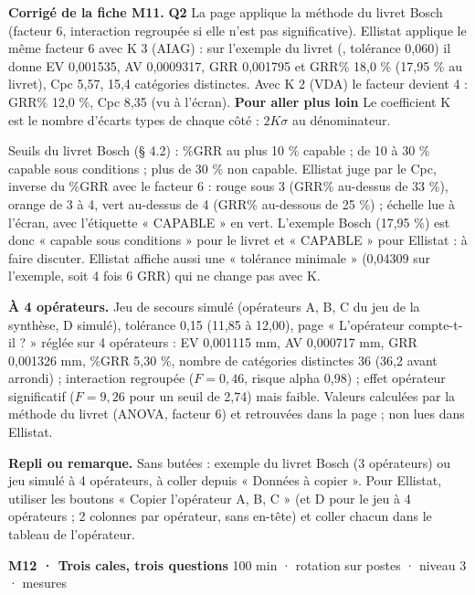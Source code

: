 \textbf{\color{ok}Corrigé de la fiche M11.} \textbf{Q2} La page applique la méthode du livret Bosch (facteur 6, interaction regroupée si elle n'est pas significative). Ellistat applique le même facteur 6 avec K 3 (AIAG) : sur l'exemple du livret (, tolérance 0,060) il donne EV 0,001535, AV 0,0009317, GRR 0,001795 et GRR\% 18,0 \% (17,95 \% au livret), Cpc 5,57, 15,4 catégories distinctes. Avec K 2 (VDA) le facteur devient 4 : GRR\% 12,0 \%, Cpc 8,35 (vu à l'écran). \textbf{Pour aller plus loin} Le coefficient K est le nombre d'écarts types de chaque côté : $2K\sigma$ au dénominateur.\par Seuils du livret Bosch (§ 4.2) : \%GRR au plus 10 \% capable ; de 10 à 30 \% capable sous conditions ; plus de 30 \% non capable. Ellistat juge par le Cpc, inverse du \%GRR avec le facteur 6 : rouge sous 3 (GRR\% au-dessus de 33 \%), orange de 3 à 4, vert au-dessus de 4 (GRR\% au-dessous de 25 \%) ; échelle lue à l'écran, avec l'étiquette « CAPABLE » en vert. L'exemple Bosch (17,95 \%) est donc « capable sous conditions » pour le livret et « CAPABLE » pour Ellistat : à faire discuter. Ellistat affiche aussi une « tolérance minimale » (0,04309 sur l'exemple, soit 4 fois 6 GRR) qui ne change pas avec K.\par \textbf{À 4 opérateurs.} Jeu de secours simulé  (opérateurs A, B, C du jeu de la synthèse, D simulé), tolérance 0,15 (11,85 à 12,00), page « L'opérateur compte-t-il ? » réglée sur 4 opérateurs : EV 0,001115 mm, AV 0,000717 mm, GRR 0,001326 mm, \%GRR 5,30 \%, nombre de catégories distinctes 36 (36,2 avant arrondi) ; interaction regroupée ($F = 0{,}46$, risque alpha 0,98) ; effet opérateur significatif ($F = 9{,}26$ pour un seuil de 2,74) mais faible. Valeurs calculées par la méthode du livret (ANOVA, facteur 6) et retrouvées dans la page ; non lues dans Ellistat.\par
{\small\textbf{Repli ou remarque.} Sans butées : exemple du livret Bosch (3 opérateurs) ou jeu simulé à 4 opérateurs, à coller depuis « Données à copier ». Pour Ellistat, utiliser les boutons « Copier l'opérateur A, B, C » (et D pour le jeu à 4 opérateurs ; 2 colonnes par opérateur, sans en-tête) et coller chacun dans le tableau de l'opérateur.}\par
\vspace{3pt}
\begin{tcolorbox}[act]\textbf{M12 · Trois cales, trois questions} \hfill {\small 100 min · rotation sur postes · niveau 3 · mesures}\end{tcolorbox}
